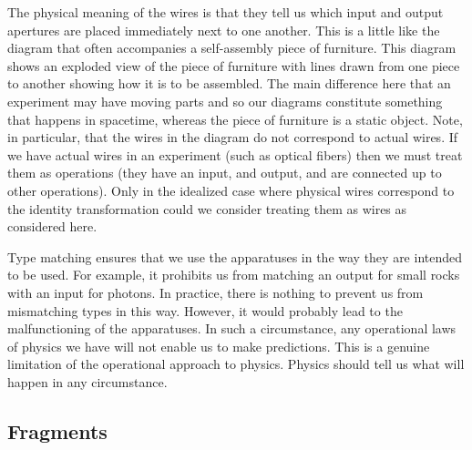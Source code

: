 \documentclass[10pt]{article}
\begin{document}
The physical meaning of the wires is that they tell us which input and output apertures are placed immediately next to one another.  This is a little like the diagram that often accompanies a self-assembly piece of furniture.  This diagram shows an exploded view of the piece of furniture with lines drawn from one piece to another showing how it is to be assembled.  The main difference here that an experiment may have moving parts and so our diagrams constitute something that happens in spacetime, whereas the piece of furniture is a static object.   Note, in particular, that the wires in the diagram do not correspond to actual wires. If we have actual wires in an experiment (such as optical fibers) then we must treat them as operations (they have an input, and output, and are connected up to other operations).  Only in the idealized case where physical wires correspond to the identity transformation could we consider treating them as wires as considered here.

Type matching ensures that we use the apparatuses in the way they are intended to be used.  For example, it prohibits us from matching an output for small rocks with an input for photons.  In practice, there is nothing to prevent us from mismatching types in this way.  However, it would probably lead to the malfunctioning of the apparatuses.  In such a circumstance, any operational laws of physics we have will not enable us to make predictions.  This is a genuine limitation of the operational approach to physics.  Physics should tell us what will happen in any circumstance.

\subsection{Fragments}\label{fragments}
\end{document}
